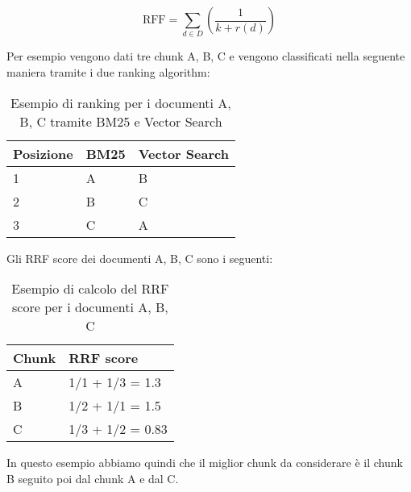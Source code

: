 \[
\text{RFF} = \sum_{d \in D} (\frac{1}{k+r(d)})    
\]

\noindent Per esempio vengono dati tre chunk A, B, C e vengono classificati nella seguente maniera tramite i due ranking algorithm:

\begin{table}[H]
    \centering
    \begin{tabular}{|p{2cm} |p{2cm} |p{2cm}|}
        \hline
        Posizione & BM25 & Vector Search \\
        \hline
        1 & A & B \\
        \hline
        2 & B & C \\
        \hline
        3 & C & A \\
        \hline
    \end{tabular}
    \caption{Esempio di ranking per i documenti A, B, C tramite BM25 e Vector Search}
\end{table}

\noindent Gli RRF score dei documenti A, B, C sono i seguenti:
\begin{table}[H]
    \centering
    \begin{tabular}{|p{3cm} | p{3cm} |}
        \hline
        Chunk & RRF score \\
        \hline
        A & 1/1 + 1/3 = 1.3\\
        \hline
        B & 1/2 + 1/1 = 1.5\\
        \hline
        C & 1/3 + 1/2 = 0.83\\
        \hline
    \end{tabular}
    \caption{Esempio di calcolo del RRF score per i documenti A, B, C}
\end{table}

\noindent In questo esempio abbiamo quindi che il miglior chunk da considerare è il chunk B seguito poi dal chunk A e dal C.




